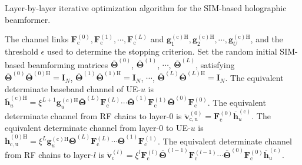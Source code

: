 \documentclass[lettersize,journal]{IEEEtran}
\theoremstyle{remark}
\begin{document}
\begin{algorithm}[!t]
\caption{Layer-by-layer iterative optimization algorithm for the SIM-based holographic beamformer.}
\label{algorithm_1}
\begin{algorithmic}[1]
\REQUIRE
    The channel links $\mathbf{F}_\mathrm{c}^{(0)},\mathbf{F}_\mathrm{c}^{(1)},\cdots,\mathbf{F}_\mathrm{c}^{(L)}$ and $\mathbf{g}_1^{(\mathrm{c})\mathrm{H}},\mathbf{g}_2^{(\mathrm{c})\mathrm{H}},\cdots,
    \mathbf{g}_U^{(\mathrm{c})\mathrm{H}}$, and the threshold $\epsilon$ used to determine the stopping criterion.
    \STATE
        Set the random initial SIM-based beamforming matrices $\overline{\mathbf{\Theta}}^{(0)}$, $\overline{\mathbf{\Theta}}^{(1)}$, $\cdots$, $\overline{\mathbf{\Theta}}^{(L)}$, satisfying $\overline{\mathbf{\Theta}}^{(0)}\overline{\mathbf{\Theta}}^{(0)\mathrm{H}}=\mathbf{I}_N$,
        $\overline{\mathbf{\Theta}}^{(1)}\overline{\mathbf{\Theta}}^{(1)\mathrm{H}}=\mathbf{I}_N$,
        $\cdots$, $\overline{\mathbf{\Theta}}^{(L)}\overline{\mathbf{\Theta}}^{(L)\mathrm{H}}=\mathbf{I}_N$.
    \REPEAT
        \STATE
            The equivalent determinate baseband channel of UE-$u$ is $\overline{\mathbf{h}}_u^{(\mathrm{c})\mathrm{H}}
                =\xi^{L+1}\mathbf{g}_u^{(\mathrm{c})\mathrm{H}}\overline{\mathbf{\Theta}}^{(L)}
                \mathbf{F}_\mathrm{c}^{(L)}\cdots\overline{\mathbf{\Theta}}^{(1)}
                \mathbf{F}_\mathrm{c}^{(1)}
                \overline{\mathbf{\Theta}}^{(0)}\mathbf{F}_\mathrm{c}^{(0)}$.
            \STATE
              The equivalent determinate channel from RF chains to layer-0 is  $\ddot{\mathbf{v}}_\mathrm{c,u}^{(0)}=
                \mathbf{F}_\mathrm{c}^{(0)}\overline{\mathbf{h}}_u^{(\mathrm{c})}$.
            \STATE
            The equivalent determinate channel from layer-0 to UE-$u$ is  $\ddot{\mathbf{h}}_\mathrm{c,u}^{(0)\mathrm{H}}
                =\xi^L\mathbf{g}_u^{(\mathrm{c})\mathrm{H}}\overline{\mathbf{\Theta}}^{(L)}
                \mathbf{F}_\mathrm{c}^{(L)}\cdots
                \overline{\mathbf{\Theta}}^{(1)}\mathbf{F}_\mathrm{c}^{(1)}$.
            \STATE
               The equivalent determinate channel from RF chains to layer-$l$ is $\ddot{\mathbf{v}}_\mathrm{c}^{(l)}=\xi^l\mathbf{F}_\mathrm{c}^{(l)}
                \overline{\mathbf{\Theta}}^{(l-1)}\mathbf{F}_\mathrm{c}^{(l-1)}\cdots
                \overline{\mathbf{\Theta}}^{(0)}\mathbf{F}_\mathrm{c}^{(0)}
                \overline{\mathbf{h}}_u^{(\mathrm{c})}$.
            \STATE

\end{algorithmic}
\end{algorithm}
\end{document}
